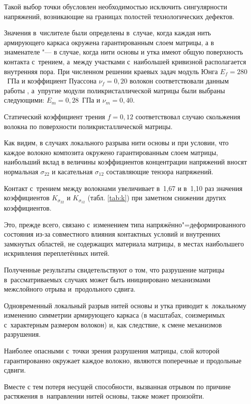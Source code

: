 Такой выбор точки обусловлен необходимостью исключить сингулярности напряжений, возникающие на границах полостей технологических дефектов. 

Значения в~числителе были определены в~случае, когда каждая нить армирующего каркаса окружена гарантированным слоем матрицы, а в знаменателе "--- в случае, когда нити основы и утка имеют общую поверхность контакта с~трением, а~между участками с~наибольшей кривизной располагается внутренняя пора. При численном решении краевых задач модуль Юнга $E_f = 280$~ГПа и коэффициент Пуассона $\nu_f = 0{,}20$ волокон соответствовали данным работы \cite{dedkov:bib:tarnapolsky}, а~упругие модули поликристаллической матрицы были выбраны следующими: $E_m = 0{,}28$~ГПа и $\nu_m = 0,40$. 

Статический коэффициент трения $f = 0{,}12$ соответствовал случаю скольжения волокна по поверхности поликристаллической матрицы.



Как видим, в случаях локального разрыва нити основы и при условии, что каждое волокно композита окружено гарантированным слоем матрицы, наибольший вклад в величины коэффициентов концентрации напряжений вносят нормальная $\sigma_{22}$ и касательная $\sigma_{12}$ составляющие тензора напряжений.

Контакт с~трением между волокнами увеличивает в~1,67 и в~1,10 раз   значения коэффициентов $K_{\sigma_{22}}$ и $K_{\sigma_{12}}$ (табл. \ref{tab:k}) при заметном снижении других коэффициентов. 

Это, прежде всего, связано с~изменением типа напряжённо"=деформированного состояния из-за совместного влияния контактных условий и внутренних замкнутых областей, не содержащих материала матрицы, в местах наибольшего искривления переплетённых нитей. 

Полученные результаты свидетельствуют о том, что разрушение матрицы в~рассматриваемых случаях может быть инициировано механизмами межслойного отрыва и~продольного сдвига.



Одновременный локальный разрыв нитей основы и утка приводит к~локальному изменению симметрии армирующего каркаса (в масштабах, соизмеримых с~характерным размером волокон) и, как следствие, к смене механизмов разрушения. 

Наиболее опасными с~точки зрения разрушения матрицы, слой которой гарантированно окружает каждое волокно, являются поперечные и продольные сдвиги. 

Вместе с тем  потеря несущей способности, вызванная отрывом по причине растяжения в~направлении нитей основы, также может произойти. 

